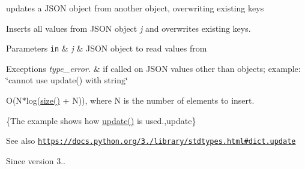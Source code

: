 updates a J\+S\+ON object from another object, overwriting existing keys 

Inserts all values from J\+S\+ON object {\itshape j} and overwrites existing keys.


\begin{DoxyParams}[1]{Parameters}
\mbox{\tt in}  & {\em j} & J\+S\+ON object to read values from\\
\hline
\end{DoxyParams}

\begin{DoxyExceptions}{Exceptions}
{\em type\+\_\+error.} & if called on J\+S\+ON values other than objects; example\+: {\ttfamily \char`\"{}cannot use update() with string\char`\"{}}\\
\hline
\end{DoxyExceptions}
O(N$\ast$log(\hyperlink{classnlohmann_1_1basic__json_a33c7c8638bb0b12e6d1b69d8106dd2e0}{size()} + N)), where N is the number of elements to insert.

\{The example shows how {\ttfamily \hyperlink{classnlohmann_1_1basic__json_a377819905d567f6f523dcbc592cb6356}{update()}} is used.,update\}

\begin{DoxySeeAlso}{See also}
\href{https://docs.python.org/3.6/library/stdtypes.html#dict.update}{\tt https\+://docs.\+python.\+org/3./library/stdtypes.\+html\#dict.\+update}
\end{DoxySeeAlso}
\begin{DoxySince}{Since}
version 3.. 
\end{DoxySince}

